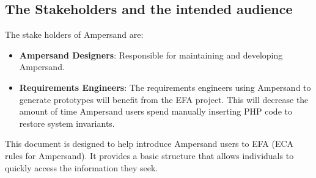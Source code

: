  \subsection{The Stakeholders and the intended audience}\label{sec:Stakeholders}
The stake holders of Ampersand are:

\begin{itemize}
	\item \textbf{Ampersand Designers}: Responsible for maintaining and developing Ampersand.
	\item \textbf{Requirements Engineers}: The requirements engineers using Ampersand
            to generate prototypes
           will benefit from the EFA
          project.
          This will decrease the amount of time 
Ampersand users spend manually inserting PHP code to restore system invariants. 
\end{itemize}

This document is designed to help introduce  Ampersand users to EFA 
(ECA rules for Ampersand). It provides a basic structure that allows 
individuals to quickly access the information they seek. 
